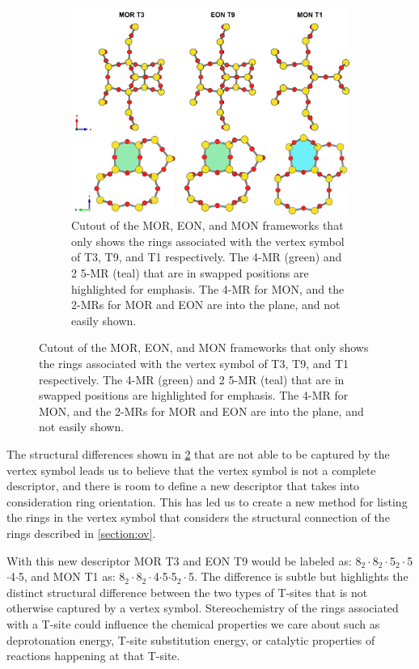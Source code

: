 \documentclass[preprint,numrefs,noinfo,sort&compress]{elsarticle}
\begin{document}
\begin{figure}
\begin{figure}[H]
\centering
\includegraphics[width=\textwidth]{figures/chapter-3/stereo.pdf}
\caption{Cutout of the MOR, EON, and MON frameworks that only shows the rings associated with the vertex symbol of T3, T9, and T1 respectively. The 4-MR (green) and 2\texttimes{} 5-MR (teal) that are in swapped positions are highlighted for emphasis. The 4-MR for MON, and the 2-MRs for MOR and EON are into the plane, and not easily shown. \label{fig:stereo}}
\end{figure}
\end{figure}

The structural differences shown in \cref{fig:stereo} that are not able to be captured by the vertex symbol leads us to believe that the vertex symbol is not a complete descriptor, and there is room to define a new descriptor that takes into consideration ring orientation. This has led us to create a new method for listing the rings in the vertex symbol that considers the structural connection of the rings described in \cref{section:ov}. 

With this new descriptor MOR T3 and EON T9 would be labeled as: 8\(_{\text{2}} \cdot\)8\(_{\text{2}} \cdot\)5\(_{\text{2}} \cdot\)5\(\cdot\)4\(\cdot\)5, and MON T1 as: 8\(_{\text{2}} \cdot\)8\(_{\text{2}} \cdot\)4\(\cdot\)5\(\cdot\)5\(_{\text{2}} \cdot\)5. The difference is subtle but highlights the distinct structural difference between the two types of T-sites that is not otherwise captured by a vertex symbol. Stereochemistry of the rings associated with a T-site could influence the chemical properties we care about such as deprotonation energy, T-site substitution energy, or catalytic properties of reactions happening at that T-site.
\end{document}
